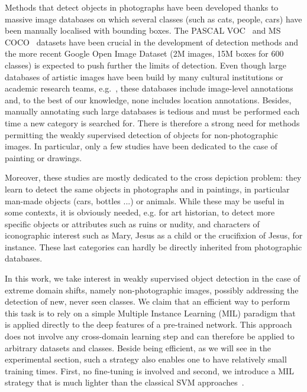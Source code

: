 \documentclass[preprint]{elsarticle}
\begin{document}
Methods that detect objects in photographs have been developed thanks to massive image databases on which several classes (such as cats, people, cars) have been manually localised with bounding boxes. The PASCAL VOC~\citep{everingham_pascal_2007} and MS COCO~\citep{lin_microsoft_2014} datasets have been crucial in the development of detection methods and the more recent Google Open Image Dataset (2M images, 15M boxes for 600 classes) is expected to push further the limits of detection. Even though large databases of artistic images have been  build by many cultural institutions or academic research teams, e.g.~\citep{rijksmuseum_online_2018,met_image_2018,wilber_bam_2017}, these databases include image-level annotations and, to the best of our knowledge, none includes location annotations. Besides, manually annotating such large databases is tedious and must be performed each time a new category is searched for.  There is therefore a strong need for methods permitting the weakly supervised detection of objects for non-photographic images. In particular, only a few studies have been dedicated to the case of painting or drawings.

Moreover, these studies are mostly dedicated to the cross depiction problem: they learn to detect the same objects in photographs and in paintings, in particular man-made objects (cars, bottles ...) or animals. While these may be useful in some contexts, it is obviously needed, e.g. for art historian, to detect more specific objects or attributes such as ruins or nudity, and characters of iconographic interest such as Mary, Jesus as a child or the crucifixion of Jesus, for instance. These last categories can hardly be directly inherited from photographic databases. 




In this work, we take interest in weakly supervised object detection in the case of extreme domain shifts, namely non-photographic images, possibly addressing the detection of new, never seen classes.  We claim that an efficient way to perform this task is to rely on a simple Multiple Instance Learning (MIL) paradigm that is applied directly to the deep features of a pre-trained network. This approach does not involve any cross-domain learning step and can therefore be applied to arbitrary datasets and classes. Beside being efficient, as we will see in the experimental section, such a strategy also enables one to have relatively small training times. First, no fine-tuning is involved and second, we introduce a MIL strategy  that is much lighter than the classical SVM approaches~\citep{andrews_support_2003}. 
\end{document}
